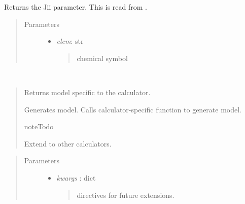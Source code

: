 \documentclass[letterpaper,10pt,english]{sphinxmanual}
\begin{document}
\begin{fulllineitems}
\begin{fulllineitems}
\end{fulllineitems}


\begin{fulllineitems}
\label{classes:catparam.CATParam.gen_jii}
Returns the Jii parameter. This is read from 
.
\begin{quote}\begin{description}
\item[{Parameters}] \leavevmode\begin{itemize}
\item {} 
\emph{elem}: str
\begin{quote}

chemical symbol
\end{quote}

\end{itemize}

\end{description}\end{quote}

\end{fulllineitems}


\begin{fulllineitems}
\label{classes:catparam.CATParam.gen_model}~\begin{quote}

Returns model specific to the calculator.

Generates model. Calls calculator-specific function to generate model.

\begin{notice}{note}{Todo}

Extend to other calculators.
\end{notice}
\end{quote}
\begin{quote}\begin{description}
\item[{Parameters}] \leavevmode\begin{itemize}
\item {} 
\emph{kwargs} : dict
\begin{quote}

directives for future extensions.
\end{quote}


\end{itemize}
\end{description}
\end{quote}
\end{fulllineitems}
\end{fulllineitems}
\end{document}
